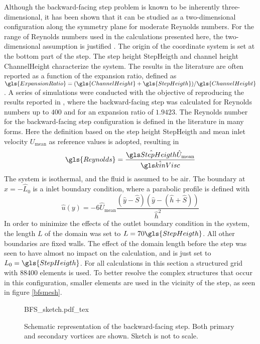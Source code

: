 Although the backward-facing step problem is known to be inherently three-dimensional, it has been shown that it can be studied as a two-dimensional configuration along the symmetry plane for moderate Reynolds numbers. For the range of Reynolds numbers used in the calculations presented here, the two-dimensional assumption is justified \citep{barkleyThreedimensionalInstabilityFlow2000, biswasBackwardFacingStepFlows2004}.  The origin of the coordinate system is set at the bottom part of the step. The step height \gls{StepHeigth} and channel height \gls{ChannelHeight} characterize the system. The results in the literature are often reported as a function of the expansion ratio, defined as $\gls{ExpansionRatio} = (\gls{ChannelHeight}+\gls{StepHeigth})/\gls{ChannelHeight}$.
A series of simulations were conducted with the objective of reproducing the results reported in \cite{biswasBackwardFacingStepFlows2004}, where the backward-facing step was calculated for Reynolds numbers up to $400$ and for an expansion ratio of $1.9423$.
The Reynolds number for the backward-facing step configuration is defined in the literature in many forms. Here the definition based on the step height \gls{StepHeigth} and mean inlet velocity $U_{\text{mean}}$ as reference values is adopted, resulting in
\begin{equation}
	\gls{Reynolds}= \frac{\glsHat{StepHeigth}\hat U_{\text{mean}}}{\glsHat{kinVisc}}
\end{equation}
The system is isothermal, and the fluid is assumed to be air. The boundary at $ \hat x = -\hat L_0$ is a inlet boundary condition, where a parabolic profile is defined with %
\begin{equation}
	\hat u(y) = -6\hat U_{\text{mean}}\frac{(\hat y-\hat S)(\hat y-(\hat h+\hat S))}{\hat h^2}
\end{equation}
In order to minimize the effects of the outlet boundary condition in the system, the length $L$ of the domain was set to $L = 70 \gls{StepHeigth}$. All other boundaries are fixed walls. The effect of the domain length before the step was seen to have almost no impact on the calculation, and is just set to $L_0 = \gls{StepHeigth}$. For all calculations in this section a structured grid with 88400 elements is used. To better resolve the complex structures that occur in this configuration, smaller elements are used in the vicinity of the step, as seen in figure \cref{bfsmesh}.

\begin{figure}[tb]
	\begin{center}
		\def\svgwidth{0.9\textwidth}
		{BFS_sketch.pdf_tex}
		\caption{Schematic representation of the backward-facing step. Both primary and secondary vortices are shown. Sketch is not to scale.}
		\label{BFSsketch}
	\end{center}
\end{figure}

